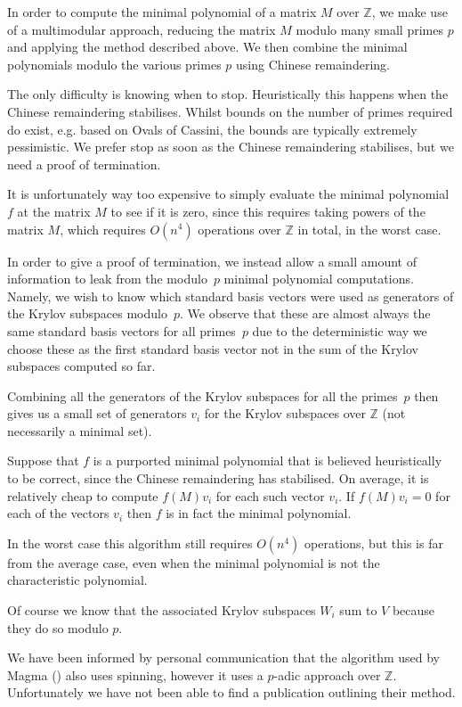 \documentclass{sig-alternate-05-2015}
\begin{document}
In order to compute the minimal polynomial of a matrix $M$ over $\mathbb{Z}$,
we make use of a multimodular approach, reducing the matrix $M$ modulo many
small primes $p$ and applying the method described above. We then combine
the minimal polynomials modulo the various primes $p$ using Chinese
remaindering.

The only difficulty is knowing when to stop. Heuristically this happens
when the Chinese remaindering stabilises. Whilst bounds on the number of
primes required do exist, e.g. based on Ovals of Cassini, the bounds are
typically extremely pessimistic. We prefer stop as soon as the Chinese
remaindering stabilises, but we need a proof of termination. 

It is unfortunately way too expensive to simply evaluate the minimal
polynomial $f$ at the matrix $M$ to see if it is zero, since this requires
taking powers of the matrix $M$, which requires $O(n^4)$ operations over
$\mathbb{Z}$ in total, in the worst case.

In order to give a proof of termination, we instead allow a small amount of
information to leak from the modulo~$p$ minimal polynomial computations.
Namely, we wish to know which standard basis vectors were used as
generators of the Krylov subspaces modulo~$p$. We observe that these are
almost always the same standard basis vectors for all primes~$p$ due to the
deterministic way we choose these as the first standard basis vector not
in the sum of the Krylov subspaces computed so far. 

Combining all the generators of the Krylov subspaces for all the primes~$p$
then gives us a small set of generators $v_i$ for the Krylov subspaces over
$\mathbb{Z}$ (not necessarily a minimal set).

Suppose that  $f$ is a purported minimal polynomial that is believed
heuristically to be correct, since the Chinese remaindering has stabilised.
On average, it is relatively cheap to compute $f(M)v_i$ for each such
vector $v_i$. If $f(M)v_i = 0$ for each of the vectors $v_i$ then $f$ is
in fact the minimal polynomial.

In the worst case this algorithm still requires $O(n^4)$ operations, but
this is far from the average case, even when the minimal polynomial is not
the characteristic polynomial.

Of course we know that the associated Krylov subspaces $W_i$ sum to $V$
because they do so modulo $p$.

We have been informed by personal communication that the algorithm used by
Magma (\cite{magma}) also uses spinning, however it uses a $p$-adic
approach over $\mathbb{Z}$. Unfortunately we have not been able to find a
publication outlining their method.
\end{document}
